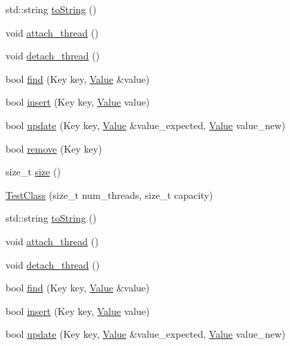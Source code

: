 \begin{DoxyCompactItemize}
\item 
std\+::string \hyperlink{class_test_class_a84e73a91ede625887472a307235d6de5}{to\+String} ()
\item 
void \hyperlink{class_test_class_a7e6bce4c39c047282ea8c1f1485a260b}{attach\+\_\+thread} ()
\item 
void \hyperlink{class_test_class_a79b3a395c8a1fac7a156228a27d829cc}{detach\+\_\+thread} ()
\item 
bool \hyperlink{class_test_class_af497b95115e81f882851b2ab843c298c}{find} (Key key, \hyperlink{hash__map_2test_object_8h_ad777bf08d8e2b01df17ba5e3c51ae11f}{Value} \&value)
\item 
bool \hyperlink{class_test_class_a0d075565ad4cccdb071bf267fe444681}{insert} (Key key, \hyperlink{hash__map_2test_object_8h_ad777bf08d8e2b01df17ba5e3c51ae11f}{Value} value)
\item 
bool \hyperlink{class_test_class_a4c33c8cac20119f9bee9b5091bc8a385}{update} (Key key, \hyperlink{hash__map_2test_object_8h_ad777bf08d8e2b01df17ba5e3c51ae11f}{Value} \&value\+\_\+expected, \hyperlink{hash__map_2test_object_8h_ad777bf08d8e2b01df17ba5e3c51ae11f}{Value} value\+\_\+new)
\item 
bool \hyperlink{class_test_class_a3a22d60709c15d419f69d29b7de92d02}{remove} (Key key)
\item 
size\+\_\+t \hyperlink{class_test_class_af2230f298ab3ef4ebf71aa7afa3fb6ca}{size} ()
\item 
\hyperlink{class_test_class_ab3dbc7a67da46dda1125f7dee533aca2}{Test\+Class} (size\+\_\+t num\+\_\+threads, size\+\_\+t capacity)
\item 
std\+::string \hyperlink{class_test_class_a84e73a91ede625887472a307235d6de5}{to\+String} ()
\item 
void \hyperlink{class_test_class_a7e6bce4c39c047282ea8c1f1485a260b}{attach\+\_\+thread} ()
\item 
void \hyperlink{class_test_class_a79b3a395c8a1fac7a156228a27d829cc}{detach\+\_\+thread} ()
\item 
bool \hyperlink{class_test_class_af497b95115e81f882851b2ab843c298c}{find} (Key key, \hyperlink{hash__map_2test_object_8h_ad777bf08d8e2b01df17ba5e3c51ae11f}{Value} \&value)
\item 
bool \hyperlink{class_test_class_a0d075565ad4cccdb071bf267fe444681}{insert} (Key key, \hyperlink{hash__map_2test_object_8h_ad777bf08d8e2b01df17ba5e3c51ae11f}{Value} value)
\item 
bool \hyperlink{class_test_class_a4c33c8cac20119f9bee9b5091bc8a385}{update} (Key key, \hyperlink{hash__map_2test_object_8h_ad777bf08d8e2b01df17ba5e3c51ae11f}{Value} \&value\+\_\+expected, \hyperlink{hash__map_2test_object_8h_ad777bf08d8e2b01df17ba5e3c51ae11f}{Value} value\+\_\+new)

\end{DoxyCompactItemize}
